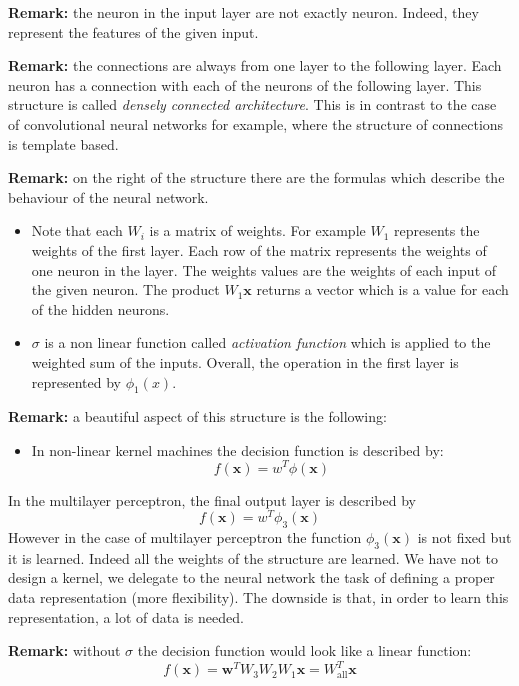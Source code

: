 \textbf{Remark:} the neuron in the input layer are not exactly neuron. Indeed, they represent the features of the given input. \newline

\textbf{Remark:} the connections are always from one layer to the following layer. Each neuron has a connection with each of the neurons of the following layer. This structure is called \textit{densely connected architecture}. This is in contrast to the case of convolutional neural networks for example, where the structure of connections is template based. \newline

\textbf{Remark:} on the right of the structure there are the formulas which describe the behaviour of the neural network.
\begin{itemize}
    \item Note that each $W_i$ is a matrix of weights. For example $W_1$ represents the weights of the first layer. Each row of the matrix represents the weights of one neuron in the layer. The weights values are the weights of each input of the given neuron. The product $W_1 \pmb{x}$ returns a vector which is a value for each of the hidden neurons.
    
    \item $\sigma$ is a non linear function called \textit{activation function} which is applied to the weighted sum of the inputs. Overall, the operation in the first layer is represented by $\phi_1(x)$.
\end{itemize}

\textbf{Remark:} a beautiful aspect of this structure is the following:
\begin{itemize}
    \item In non-linear kernel machines the decision function is described by: $$f(\pmb{x}) = w^T \phi(\pmb{x})$$
\end{itemize} In the multilayer perceptron, the final output layer is described by $$f(\pmb{x}) = w^T \phi_3(\pmb{x})$$
However in the case of multilayer perceptron the function $\phi_3(\pmb{x})$ is not fixed but it is learned. Indeed all the weights of the structure are learned. We have not to design a kernel, we delegate to the neural network the task of defining a proper data representation (more flexibility). The downside is that, in order to learn this representation, a lot of data is needed. \newline

\textbf{Remark:} without $\sigma$ the decision function would look like a linear function:
$$f(\pmb{x}) = \pmb{w}^T W_3 W_2 W_1 \pmb{x} = W_{\text{all}}^T \pmb{x}$$


